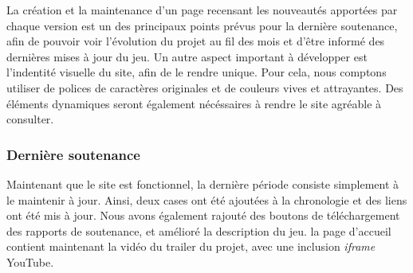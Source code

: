             La création et la maintenance d'un page recensant les nouveautés apportées par chaque version est un des 
            principaux points prévus pour la dernière soutenance, afin de pouvoir voir l'évolution du projet au fil des 
            mois et d'être informé des dernières mises à jour du jeu. Un autre aspect important à développer est l'indentité
            visuelle du site, afin de le rendre unique. Pour cela,  nous comptons utiliser de polices de caractères originales 
            et de couleurs vives et attrayantes. Des éléments dynamiques seront également nécéssaires à rendre le site agréable 
            à consulter.

    \vspace{0.5cm}
    \subsubsection{Dernière soutenance}
    \vspace{0.5cm}

        Maintenant que le site est fonctionnel, la dernière période consiste simplement à le maintenir à jour. Ainsi, deux cases 
        ont été ajoutées à la chronologie et des liens ont été mis à jour. Nous avons également rajouté des boutons de téléchargement 
        des rapports de soutenance, et amélioré la description du jeu. la page d'accueil contient maintenant la vidéo du trailer du projet, 
        avec une inclusion \textit{iframe} YouTube.